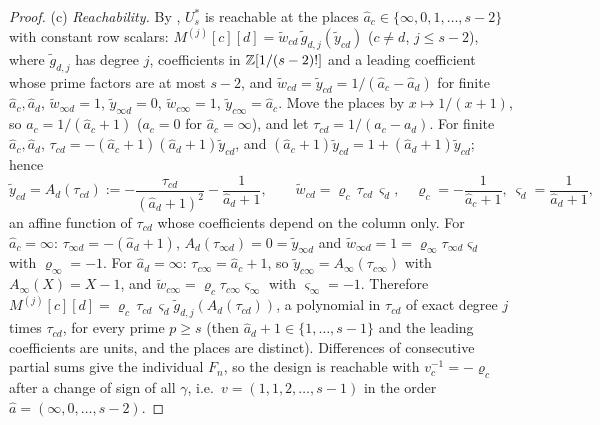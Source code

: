 \begin{proof}
(c) \emph{Reachability.} By \cite{Gru26geo}%
, $U^*_s$ is reachable at the places $\hat a_c\in\{\infty,0,1,\dots,s-2\}$ with constant row scalars: $M^{(j)}[c][d]=\tilde w_{cd}\,\tilde g_{d,j}(\tilde y_{cd})$ ($c\ne d$, $j\le s-2$), where $\tilde g_{d,j}$ has degree $j$, coefficients in $\mathbb{Z}[1/(s-2)!]$ and a leading coefficient whose prime factors are at most $s-2$, and $\tilde w_{cd}=\tilde y_{cd}=1/(\hat a_c-\hat a_d)$ for finite $\hat a_c,\hat a_d$, $\tilde w_{\infty d}=1$, $\tilde y_{\infty d}=0$, $\tilde w_{c\infty}=1$, $\tilde y_{c\infty}=\hat a_c$. Move the places by $x\mapsto1/(x+1)$, so $a_c=1/(\hat a_c+1)$ ($a_c=0$ for $\hat a_c=\infty$), and let $\tau_{cd}=1/(a_c-a_d)$. For finite $\hat a_c,\hat a_d$, $\tau_{cd}=-(\hat a_c+1)(\hat a_d+1)\tilde y_{cd}$, and $(\hat a_c+1)\tilde y_{cd}=1+(\hat a_d+1)\tilde y_{cd}$; hence
\[
\tilde y_{cd}=A_d(\tau_{cd}):=-\frac{\tau_{cd}}{(\hat a_d+1)^2}-\frac1{\hat a_d+1},\qquad \tilde w_{cd}=\varrho_c\,\tau_{cd}\,\varsigma_d,\quad \varrho_c=-\frac1{\hat a_c+1},\ \varsigma_d=\frac1{\hat a_d+1},
\]
an affine function of $\tau_{cd}$ whose coefficients depend on the column only. For $\hat a_c=\infty$: $\tau_{\infty d}=-(\hat a_d+1)$, $A_d(\tau_{\infty d})=0=\tilde y_{\infty d}$ and $\tilde w_{\infty d}=1=\varrho_\infty\tau_{\infty d}\varsigma_d$ with $\varrho_\infty=-1$. For $\hat a_d=\infty$: $\tau_{c\infty}=\hat a_c+1$, so $\tilde y_{c\infty}=A_\infty(\tau_{c\infty})$ with $A_\infty(X)=X-1$, and $\tilde w_{c\infty}=\varrho_c\tau_{c\infty}\varsigma_\infty$ with $\varsigma_\infty=-1$. Therefore $M^{(j)}[c][d]=\varrho_c\,\tau_{cd}\,\varsigma_d\tilde g_{d,j}(A_d(\tau_{cd}))$, a polynomial in $\tau_{cd}$ of exact degree $j$ times $\tau_{cd}$, for every prime $p\ge s$ (then $\hat a_d+1\in\{1,\dots,s-1\}$ and the leading coefficients are units, and the places are distinct). Differences of consecutive partial sums give the individual $F_n$, so the design is reachable with $v_c^{-1}=-\varrho_c$ after a change of sign of all $\gamma$, i.e.\ $v=(1,1,2,\dots,s-1)$ in the order $\hat a=(\infty,0,\dots,s-2)$.


\end{proof}
